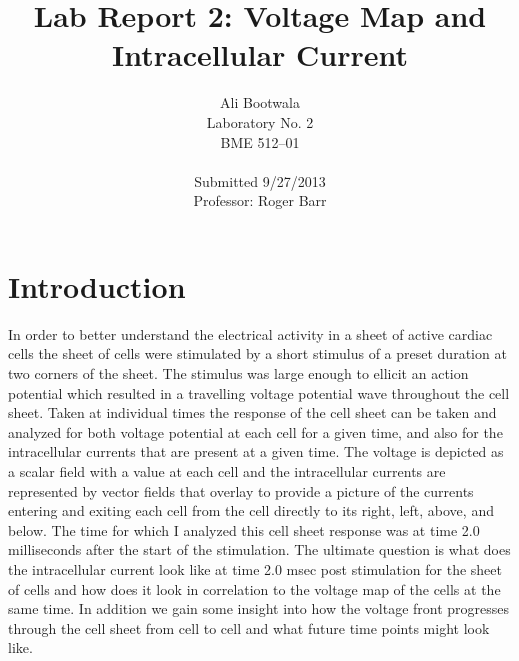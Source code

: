 \documentclass[10pt, titlepage]{article}
\title{Lab Report 2: Voltage Map and Intracellular Current }
\author{
\normalsize Ali Bootwala  \\
\normalsize Laboratory No. 2 \\
\normalsize BME 512--01\\~\\
\normalsize Submitted 9/27/2013 \\
\normalsize Professor: Roger Barr  
}
\begin{document}
   
\maketitle
\newpage

\pagestyle{plain}
\tableofcontents 
\vspace{1cm}
\listoffigures
\vspace{1cm}
\listoftables
\newpage
\pagestyle{fancyplain}


\section{Introduction}
In order to better understand the electrical activity in a sheet of active cardiac cells the sheet of cells were stimulated by a short stimulus of a preset duration at two corners of the sheet. The stimulus was large enough to ellicit an action potential which resulted in a travelling voltage potential wave throughout the cell sheet. Taken at individual times the response of the cell sheet can be taken and analyzed for both voltage potential at each cell for a given time, and also for the intracellular currents that are present at a given time. The voltage is depicted as a scalar field with a value at each cell and the intracellular currents are represented by vector fields that overlay to provide a picture of the currents entering and exiting each cell from the cell directly to its right, left, above, and below. The time for which I analyzed this cell sheet response was at time 2.0 milliseconds after the start of the stimulation. The ultimate question is what does the intracellular current look like at time 2.0 msec post stimulation for the sheet of cells and how does it look in correlation to the voltage map of the cells at the same time. In addition we gain some insight into how the voltage front progresses through the cell sheet from cell to cell and what future time points might look like.
\end{document}
